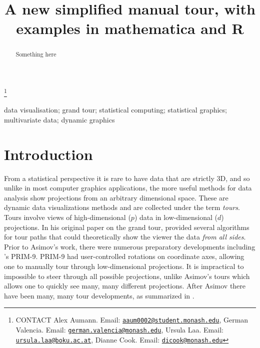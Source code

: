 \documentclass[]{interact}
\theoremstyle{plain}%
\theoremstyle{definition}
\theoremstyle{remark}
\begin{document}

\title{A new simplified manual tour, with examples in mathematica and R}


\author{
}

\thanks{CONTACT Alex
Aumann. Email: \href{mailto:aaum0002@student.monash.edu}{\nolinkurl{aaum0002@student.monash.edu}}, German
Valencia. Email: \href{mailto:german.valencia@monash.edu}{\nolinkurl{german.valencia@monash.edu}}, Ursula
Laa. Email: \href{mailto:ursula.laa@boku.ac.at}{\nolinkurl{ursula.laa@boku.ac.at}}, Dianne
Cook. Email: \href{mailto:dicook@monash.edu}{\nolinkurl{dicook@monash.edu}}}

\maketitle

\begin{abstract}
Something here
\end{abstract}

\begin{keywords}
data visualisation; grand tour; statistical computing; statistical
graphics; multivariate data; dynamic graphics
\end{keywords}

\hypertarget{introduction}{%
\section{Introduction}\label{introduction}}

From a statistical perspective it is rare to have data that are strictly
3D, and so unlike in most computer graphics applications, the more
useful methods for data analysis show projections from an arbitrary
dimensional space. These are dynamic data visualizations methods and are
collected under the term \emph{tours}. Tours involve views of
high-dimensional (\(p\)) data in low-dimensional (\(d\)) projections. In
his original paper on the grand tour, \citet{As85} provided several
algorithms for tour paths that could theoretically show the viewer the
data \emph{from all sides}. Prior to Asimov's work, there were numerous
preparatory developments including \citet{tukey}'s PRIM-9. PRIM-9 had
user-controlled rotations on coordinate axes, allowing one to manually
tour through low-dimensional projections. It is impractical to
impossible to steer through all possible projections, unlike Asimov's
tours which allows one to quickly see many, many different projections.
After Asimov there have been many, many tour developments, as summarized
in \citet{lee2021}.
\end{document}
